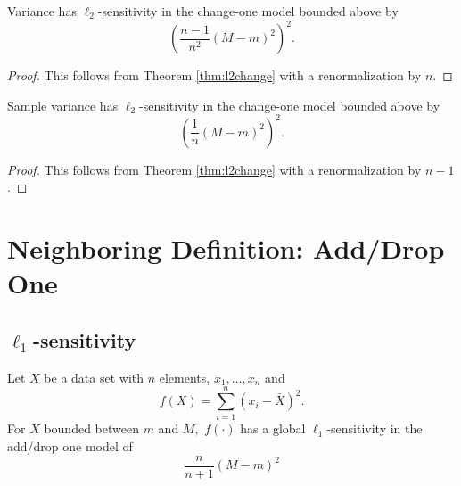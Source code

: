 \documentclass[11pt]{scrartcl} %
\begin{document}
\begin{corollary}
Variance has $\ell_2$-sensitivity in the change-one model bounded above by
$$ \left(\frac{n-1}{n^2} (M-m)^2\right)^2.$$ 
\end{corollary}

\begin{proof}
This follows from Theorem \ref{thm:l2change} with a renormalization by $n$.
\end{proof}

\begin{corollary}
Sample variance has $\ell_2$-sensitivity in the change-one model bounded above by
$$ \left(\frac{1}{n} (M-m)^2\right)^2.$$ 
\end{corollary}

\begin{proof}
This follows from Theorem \ref{thm:l2change} with a renormalization by $n-1$.
\end{proof}

\section{Neighboring Definition: Add/Drop One}
\subsection{$\ell_1$-sensitivity}
 \begin{theorem}
 \label{thm:l1addsub}
 	Let $X$ be a data set with $n$ elements, $x_1, \hdots, x_n$ and
 	\[ f(X) = \sum_{i=1}^n (x_i - \bar{X})^2. \]
 	For $X$ bounded between $m$ and $M,$ $f(\cdot)$ has a global $\ell_1$-sensitivity in the add/drop one model of
 	\[ \frac{n}{n+1} (M-m)^2 \]
 \end{theorem}
\end{document}
